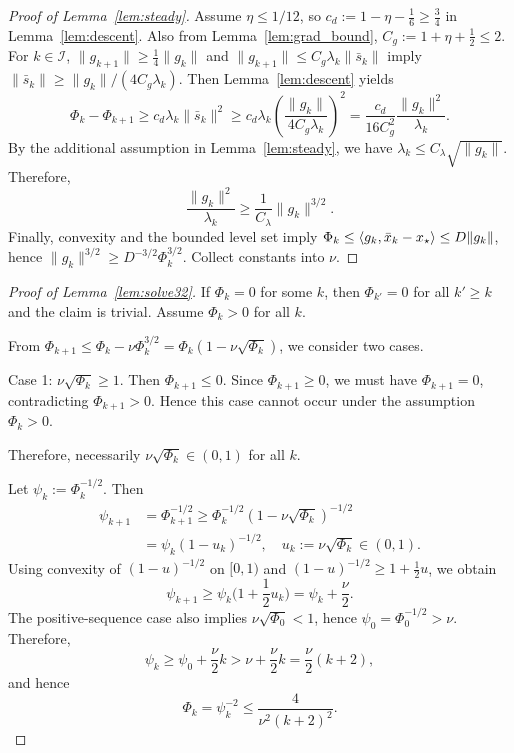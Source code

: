 \documentclass[review,onefignum,onetabnum]{siamart171218}
\begin{document}
	\begin{proof}[Proof of Lemma~\ref{lem:steady}]
		Assume $\eta\le 1/12$, so $c_d:=1-\eta-\frac16\ge \frac34$ in Lemma~\ref{lem:descent}.
		Also from Lemma~\ref{lem:grad_bound}, $C_g:=1+\eta+\frac12\le 2$.
		For $k\in\mathcal I$, $\|g_{k+1}\|\ge \frac14\|g_k\|$ and $\|g_{k+1}\|\le C_g\lambda_k\|\bar s_k\|$ imply
		$\|\bar s_k\|\ge \|g_k\|/(4C_g\lambda_k)$.
		Then Lemma~\ref{lem:descent} yields
		\[
		\Phi_k-\Phi_{k+1}\ge c_d\lambda_k\|\bar s_k\|^2
		\ge c_d\lambda_k\left(\frac{\|g_k\|}{4C_g\lambda_k}\right)^2
		=\frac{c_d}{16C_g^2}\frac{\|g_k\|^2}{\lambda_k}.
		\]
		By the additional assumption in Lemma~\ref{lem:steady}, we have $\lambda_k\le C_\lambda\sqrt{\|g_k\|}$.
		Therefore,
		\[
		\frac{\|g_k\|^2}{\lambda_k}\ge \frac{1}{C_\lambda}\|g_k\|^{3/2}.
		\]
		Finally, convexity and the bounded level set imply $\Phi_k\le \left\langle g_k,\bar x_k-x_\star\right\rangle\le D\|g_k\|$, hence
		$\|g_k\|^{3/2}\ge D^{-3/2}\Phi_k^{3/2}$.
		Collect constants into $\nu$.
	\end{proof}
	
	\begin{proof}[Proof of Lemma~\ref{lem:solve32}]
		If $\Phi_k=0$ for some $k$, then $\Phi_{k'}=0$ for all $k'\ge k$ and the claim is trivial.
		Assume $\Phi_k>0$ for all $k$.
		
		From $\Phi_{k+1}\le \Phi_k-\nu \Phi_k^{3/2}=\Phi_k(1-\nu\sqrt{\Phi_k})$, we consider two cases.
		
		Case 1: $\nu\sqrt{\Phi_k}\ge 1$.
		Then $\Phi_{k+1}\le 0$. Since $\Phi_{k+1}\ge 0$, we must have $\Phi_{k+1}=0$,
		contradicting $\Phi_{k+1}>0$.
		Hence this case cannot occur under the assumption $\Phi_k>0$.
		
		Therefore, necessarily $\nu\sqrt{\Phi_k}\in(0,1)$ for all $k$.
		
		Let $\psi_k:=\Phi_k^{-1/2}$. Then
		\begin{align*}
			\psi_{k+1}&=\Phi_{k+1}^{-1/2}\ge \Phi_k^{-1/2}(1\!-\!\nu\sqrt{\Phi_k})^{-1/2}\\
			&=\psi_k(1\!-\!u_k)^{-1/2},\quad u_k:=\nu\sqrt{\Phi_k}\in(0,1).
		\end{align*}
		Using convexity of $(1-u)^{-1/2}$ on $[0,1)$ and $(1-u)^{-1/2}\ge 1+\frac12u$, we obtain
		\[
		\psi_{k+1}\ge \psi_k\Big(1+\frac12 u_k\Big)=\psi_k+\frac{\nu}{2}.
		\]
		The positive-sequence case also implies
		$\nu\sqrt{\Phi_0}<1$, hence $\psi_0=\Phi_0^{-1/2}>\nu$.
		Therefore,
		\[
		\psi_k\ge \psi_0+\frac{\nu}{2}k
		> \nu+\frac{\nu}{2}k
		= \frac{\nu}{2}(k+2),
		\]
		and hence
		\[
		\Phi_k=\psi_k^{-2}\le \frac{4}{\nu^2(k+2)^2}.
		\]
	\end{proof}
	
\end{document}

